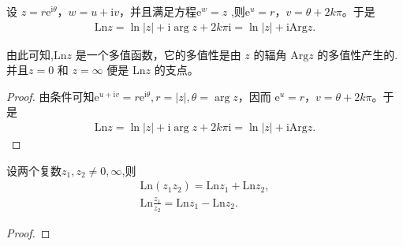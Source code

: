 \documentclass[../../main.tex]{subfiles}%
\begin{document}
\begin{theorem}
设 \( z = r\mathrm{e}^{\mathrm{i}\theta} \)，\( w = u + \mathrm{i}v \)，并且满足方程\( \mathrm{e}^w = z \) ,则\( \mathrm{e}^u = r \)，\( v = \theta + 2k\pi \)。于是
\begin{align*}
\mathrm{Ln} z = \ln|z| + \mathrm{i}\arg z + 2k\pi\mathrm{i} = \ln|z| + \mathrm{i}\mathrm{Arg} z.
\end{align*}
\end{theorem}
\begin{remark}
由此可知,\( \mathrm{Ln} z \) 是一个多值函数，它的多值性是由 \( z \) 的辐角 \( \mathrm{Arg} z \) 的多值性产生的.
并且\( z = 0 \) 和 \( z = \infty \) 便是 \( \mathrm{Ln} z \) 的支点。
\end{remark}
\begin{proof}
由条件可知\( \mathrm{e}^{u + \mathrm{i}v} = r\mathrm{e}^{\mathrm{i}\theta} ,r=|z|,\theta = \arg z\)，因而 \( \mathrm{e}^u = r \)，\( v = \theta + 2k\pi \)。于是
\begin{align*}
\mathrm{Ln} z = \ln|z| + \mathrm{i}\arg z + 2k\pi\mathrm{i} = \ln|z| + \mathrm{i}\mathrm{Arg} z.
\end{align*}
\end{proof}

\begin{theorem}[对数函数的基本性质]
设两个复数$z_1,z_2\neq 0,\infty$,则
\begin{gather*}
\mathrm{Ln}\left( z_1z_2 \right) =\mathrm{Ln}z_1+\mathrm{Ln}z_2,
\\
\mathrm{Ln}\frac{z_1}{z_2}=\mathrm{Ln}z_1-\mathrm{Ln}z_2.
\end{gather*}
\end{theorem}
\begin{proof}

\end{proof}
\end{document}
